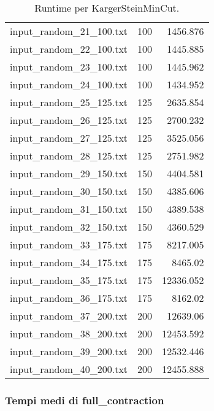 \begin{table}[H]
\begin{tabular}{lrr}
     input\_random\_21\_100.txt &     100 &    1456.876  \\
     input\_random\_22\_100.txt &     100 &    1445.885  \\
     input\_random\_23\_100.txt &     100 &    1445.962  \\
     input\_random\_24\_100.txt &     100 &    1434.952  \\
     input\_random\_25\_125.txt &     125 &    2635.854  \\
     input\_random\_26\_125.txt &     125 &    2700.232  \\
     input\_random\_27\_125.txt &     125 &    3525.056  \\
     input\_random\_28\_125.txt &     125 &    2751.982  \\
     input\_random\_29\_150.txt &     150 &    4404.581  \\
     input\_random\_30\_150.txt &     150 &    4385.606  \\
     input\_random\_31\_150.txt &     150 &    4389.538  \\
     input\_random\_32\_150.txt &     150 &    4360.529  \\
     input\_random\_33\_175.txt &     175 &    8217.005  \\
     input\_random\_34\_175.txt &     175 &    8465.02   \\
     input\_random\_35\_175.txt &     175 &   12336.052  \\
     input\_random\_36\_175.txt &     175 &    8162.02   \\
     input\_random\_37\_200.txt &     200 &    12639.06  \\
     input\_random\_38\_200.txt &     200 &   12453.592  \\
     input\_random\_39\_200.txt &     200 &   12532.446  \\
     input\_random\_40\_200.txt &     200 &   12455.888  \\
     \hline
    \end{tabular}

    \caption{Runtime per KargerSteinMinCut.}
    \label{table:karger-stein-running-time}
\end{table}

\subsubsection{Tempi medi di full\_contraction}


